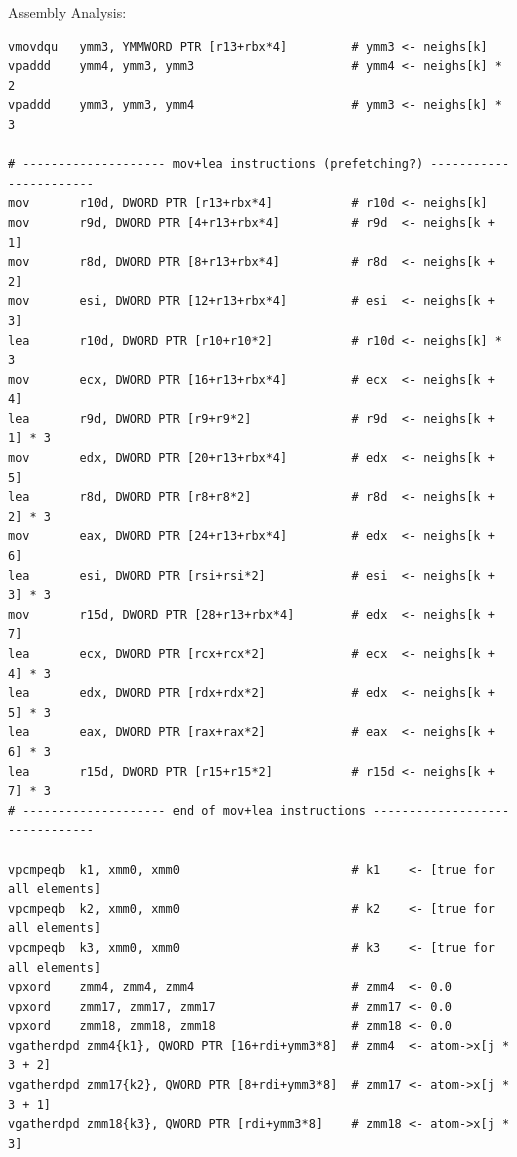 \documentclass[aspectratio=43,t]{beamer}
\begin{document}
  \begin{frame}[fragile]{Assembly Analysis:}
    \begin{lstlisting}[basicstyle=\tt\tiny]
vmovdqu   ymm3, YMMWORD PTR [r13+rbx*4]         # ymm3 <- neighs[k]
vpaddd    ymm4, ymm3, ymm3                      # ymm4 <- neighs[k] * 2
vpaddd    ymm3, ymm3, ymm4                      # ymm3 <- neighs[k] * 3

# -------------------- mov+lea instructions (prefetching?) -----------------------
mov       r10d, DWORD PTR [r13+rbx*4]           # r10d <- neighs[k]
mov       r9d, DWORD PTR [4+r13+rbx*4]          # r9d  <- neighs[k + 1]
mov       r8d, DWORD PTR [8+r13+rbx*4]          # r8d  <- neighs[k + 2]
mov       esi, DWORD PTR [12+r13+rbx*4]         # esi  <- neighs[k + 3]
lea       r10d, DWORD PTR [r10+r10*2]           # r10d <- neighs[k] * 3
mov       ecx, DWORD PTR [16+r13+rbx*4]         # ecx  <- neighs[k + 4]
lea       r9d, DWORD PTR [r9+r9*2]              # r9d  <- neighs[k + 1] * 3
mov       edx, DWORD PTR [20+r13+rbx*4]         # edx  <- neighs[k + 5]
lea       r8d, DWORD PTR [r8+r8*2]              # r8d  <- neighs[k + 2] * 3
mov       eax, DWORD PTR [24+r13+rbx*4]         # edx  <- neighs[k + 6]
lea       esi, DWORD PTR [rsi+rsi*2]            # esi  <- neighs[k + 3] * 3
mov       r15d, DWORD PTR [28+r13+rbx*4]        # edx  <- neighs[k + 7]
lea       ecx, DWORD PTR [rcx+rcx*2]            # ecx  <- neighs[k + 4] * 3
lea       edx, DWORD PTR [rdx+rdx*2]            # edx  <- neighs[k + 5] * 3
lea       eax, DWORD PTR [rax+rax*2]            # eax  <- neighs[k + 6] * 3
lea       r15d, DWORD PTR [r15+r15*2]           # r15d <- neighs[k + 7] * 3
# -------------------- end of mov+lea instructions -------------------------------

vpcmpeqb  k1, xmm0, xmm0                        # k1    <- [true for all elements]
vpcmpeqb  k2, xmm0, xmm0                        # k2    <- [true for all elements]
vpcmpeqb  k3, xmm0, xmm0                        # k3    <- [true for all elements]
vpxord    zmm4, zmm4, zmm4                      # zmm4  <- 0.0
vpxord    zmm17, zmm17, zmm17                   # zmm17 <- 0.0
vpxord    zmm18, zmm18, zmm18                   # zmm18 <- 0.0
vgatherdpd zmm4{k1}, QWORD PTR [16+rdi+ymm3*8]  # zmm4  <- atom->x[j * 3 + 2]
vgatherdpd zmm17{k2}, QWORD PTR [8+rdi+ymm3*8]  # zmm17 <- atom->x[j * 3 + 1]
vgatherdpd zmm18{k3}, QWORD PTR [rdi+ymm3*8]    # zmm18 <- atom->x[j * 3]
    \end{lstlisting}
  \end{frame}
\end{document}
